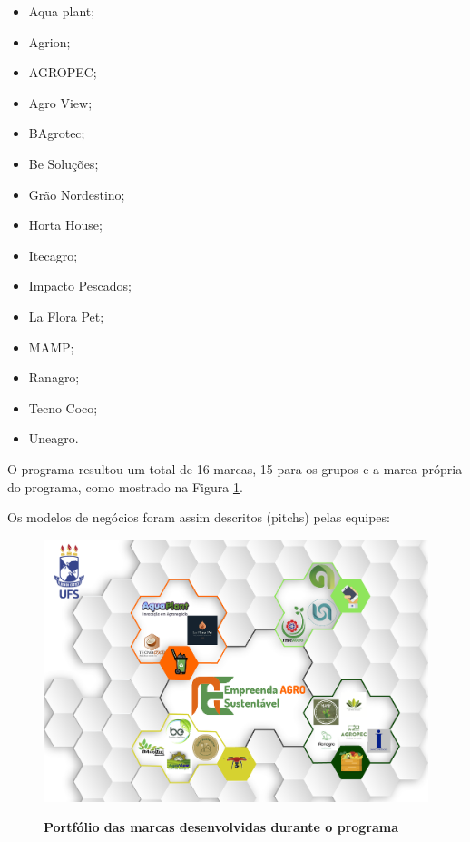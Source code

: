 \begin{multicols}{3}
\centering
    \begin{itemize}
\item { Aqua plant;}
\item { Agrion;}
\item { AGROPEC;}
\item { Agro View;}
\item { BAgrotec;}
\item { Be Soluções;}
\item { Grão Nordestino;}
\item { Horta House;}
\item { Itecagro;}
\item { Impacto Pescados;}
\item { La Flora Pet;}
\item { MAMP;}
\item { Ranagro;}
\item { Tecno Coco;}
\item { Uneagro.}
\end{itemize}
\end{multicols}

O programa resultou um total de 16 marcas, 15 para os grupos e a marca própria do programa, como mostrado na Figura \ref{fig_marcas}.

Os modelos de negócios foram assim descritos (pitchs) pelas equipes:
\begin{figure}[H]
\centering
\caption{\textbf{Portfólio das marcas desenvolvidas durante o programa}}
\includegraphics[scale=0.5]{Imagens/portfolio_2.png}
\label{fig_marcas}
\end{figure}


